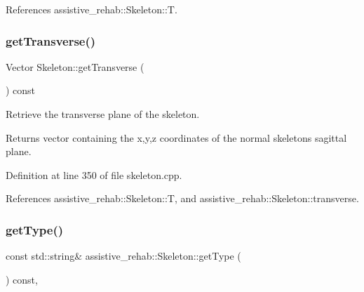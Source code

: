 References assistive\+\_\+rehab\+::\+Skeleton\+::T.

\mbox{\label{classassistive__rehab_1_1Skeleton_a35c3cdea575eb474a2cb8e0186011cff}} 
\subsubsection{\texorpdfstring{getTransverse()}{getTransverse()}}
{\footnotesize\ttfamily Vector Skeleton\+::get\+Transverse (\begin{DoxyParamCaption}{ }\end{DoxyParamCaption}) const\hspace{0.3cm}{\ttfamily [inherited]}}



Retrieve the transverse plane of the skeleton. 

\begin{DoxyReturn}{Returns}
vector containing the x,y,z coordinates of the normal skeleton\textquotesingle{}s sagittal plane. 
\end{DoxyReturn}


Definition at line 350 of file skeleton.\+cpp.


\begin{DoxyCode}{0}

\end{DoxyCode}


References assistive\+\_\+rehab\+::\+Skeleton\+::T, and assistive\+\_\+rehab\+::\+Skeleton\+::transverse.

\mbox{\label{classassistive__rehab_1_1Skeleton_a4efc4844bd2b185f1080ee52ab69cb04}} 
\subsubsection{\texorpdfstring{getType()}{getType()}}
{\footnotesize\ttfamily const std\+::string\& assistive\+\_\+rehab\+::\+Skeleton\+::get\+Type (\begin{DoxyParamCaption}{ }\end{DoxyParamCaption}) const\hspace{0.3cm}{\ttfamily [inline]}, {\ttfamily [inherited]}}




